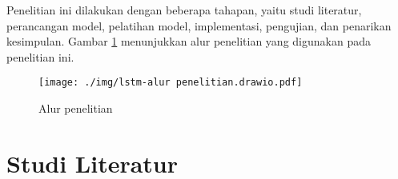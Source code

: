 



Penelitian ini dilakukan dengan beberapa tahapan, yaitu studi literatur, perancangan model, pelatihan model, implementasi, pengujian, dan penarikan kesimpulan. Gambar \ref{fig:alur-penelitian} menunjukkan alur penelitian yang digunakan pada penelitian ini.

\begin{figure}[tph]
	\centering
	\texttt{[image: ./img/lstm-alur penelitian.drawio.pdf]}
	\caption{Alur penelitian}
	\label{fig:alur-penelitian}
\end{figure}

\section{Studi Literatur}
\label{subsec: metodologi-studi-literatur}

